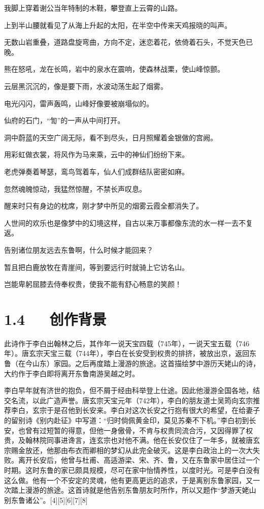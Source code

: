 \documentclass[letterpaper,10pt,english]{sphinxmanual}
\begin{document}
我脚上穿着谢公当年特制的木鞋，攀登直上云霄的山路。

上到半山腰就看见了从海上升起的太阳，在半空中传来天鸡报晓的叫声。

无数山岩重叠，道路盘旋弯曲，方向不定，迷恋着花，依倚着石头，不觉天色已晚。

熊在怒吼，龙在长鸣，岩中的泉水在震响，使森林战栗，使山峰惊颤。

云层黑沉沉的，像是要下雨，水波动荡生起了烟雾。

电光闪闪，雷声轰鸣，山峰好像要被崩塌似的。

仙府的石门，“訇”的一声从中间打开。

洞中蔚蓝的天空广阔无际，看不到尽头，日月照耀着金银做的宫阙。

用彩虹做衣裳，将风作为马来乘，云中的神仙们纷纷下来。

老虎弹奏着琴瑟，鸾鸟驾着车，仙人们成群结队密密如麻。

忽然魂魄惊动，我猛然惊醒，不禁长声叹息。

醒来时只有身边的枕席，刚才梦中所见的烟雾云霞全都消失了。

人世间的欢乐也是像梦中的幻境这样，自古以来万事都像东流的水一样一去不复返。

告别诸位朋友远去东鲁啊，什么时候才能回来？

暂且把白鹿放牧在青崖间，等到要远行时就骑上它访名山。

岂能卑躬屈膝去侍奉权贵，使我不能有舒心畅意的笑颜！


\section{1.4   创作背景}
\label{\detokenize{p01_u6563_u6587/_u674e_u767d-_u68a6_u6e38_u5929_u59e5_u541f_u7559_u522b:id6}}
此诗作于李白出翰林之后，其作年一说天宝四载（745年），一说天宝五载（746年）。唐玄宗天宝三载（744年），李白在长安受到权贵的排挤，被放出京，返回东鲁（在今山东）家园。之后再度踏上漫游的旅途。这首描绘梦中游历天姥山的诗，大约作于李白即将离开东鲁南游吴越之时。

李白早年就有济世的抱负，但不屑于经由科举登上仕途。因此他漫游全国各地，结交名流，以此广造声誉。唐玄宗天宝元年（742年），李白的朋友道士吴筠向玄宗推荐李白，玄宗于是召他到长安来。李白对这次长安之行抱有很大的希望，在给妻子的留别诗《别内赴征》中写道：“归时倘佩黄金印，莫见苏秦不下机。”李白初到长安，也曾有过短暂的得意，但他一身傲骨，不肯与权贵同流合污，又因得罪了权贵，及翰林院同事进谗言，连玄宗也对他不满。他在长安仅住了一年多，就被唐玄宗赐金放还，他那由布衣而卿相的梦幻从此完全破灭。这是李白政治上的一次大失败。离开长安后，他曾与杜甫、高适游梁、宋、齐、鲁，又在东鲁家中居住过一个时期。这时东鲁的家已颇具规模，尽可在家中怡情养性，以度时光。可是李白没有这么做。他有一个不安定的灵魂，他有更高更远的追求，于是离别东鲁家园，又一次踏上漫游的旅途。这首诗就是他告别东鲁朋友时所作，所以又题作“梦游天姥山别东鲁诸公”。{[}4{]}{[}5{]}{[}6{]}{[}7{]}{[}8{]}
\end{document}

